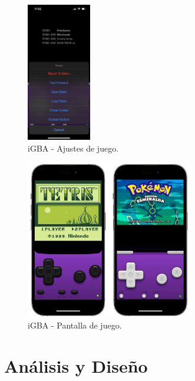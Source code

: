 \begin{figure}[h]
    \centering
    \includegraphics[width=0.25\textwidth]{include/images/igbasettings.PNG}
    \caption{iGBA - Ajustes de juego.}
    \label{figure:igbasettings}
\end{figure}

\begin{figure}[h]
    \centering
    \includegraphics[width=0.65\textwidth]{include/images/iGBAgame.png}
    \caption{iGBA - Pantalla de juego.}
    \label{figure:igbagame}
\end{figure}


\cleardoublepage

\chapter{Análisis y Diseño}
\label{design}

